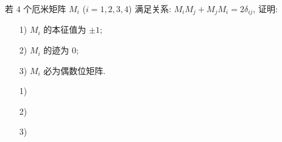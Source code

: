 \documentclass{assignment}
\begin{document}
\begin{prob}
    若 $4$ 个厄米矩阵 $M_i$ ($i=1,2,3,4$) 满足关系: $M_iM_j+M_jM_i=2\delta_{ij}$, 证明:
    \begin{itemize}
        \item[1)] $M_i$ 的本征值为 $\pm 1$;
        \item[2)] $M_i$ 的迹为 $0$;
        \item[3)] $M_i$ 必为偶数位矩阵.
    \end{itemize}
\end{prob}
\begin{pf}
    \begin{itemize}
        \item[1)] 
        \item[2)] 
        \item[3)] 
    \end{itemize}
\end{pf}
\end{document}
